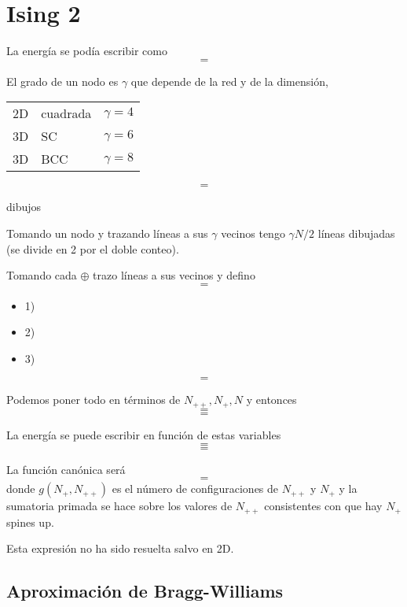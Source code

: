 \documentclass[10pt,oneside]{CBFT_book}
\begin{document}
\section{Ising 2}

La energía se podía escribir como
\[
	=
\]

El grado de un nodo es $\gamma$ que depende de la red y de la dimensión,
\begin{center}
\begin{tabular}{lll}
2D & cuadrada & $\gamma=4$ \\
3D & SC & $\gamma=6$ \\
3D & BCC & $\gamma=8$
\end{tabular}
\end{center}


\[ = \]

dibujos

Tomando un nodo y trazando líneas a sus $\gamma$ vecinos tengo $ \gamma N/2 $ líneas dibujadas
(se divide en 2 por el doble conteo).

Tomando cada $\oplus$ trazo líneas a sus vecinos y defino
\[ = \]
\begin{itemize}
 \item 1)
 \item 2)
 \item 3)
\end{itemize}

\[=\]

Podemos poner todo en términos de $N_{++}, N_+, N$ y entonces
\[=\]
\[=\]

La energía se puede escribir en función de estas variables
\[=\]
\[=\]


La función canónica será
\[=\]
donde $g(N_+,N_{++})$ es el número de configuraciones de $N_{++}$ y $N_{+}$ y la sumatoria primada se hace 
sobre los valores de $N_{++}$ consistentes con que hay $N_{+}$ spines up.

Esta expresión no ha sido resuelta salvo en 2D.

\subsection{Aproximación de Bragg-Williams}
\end{document}
